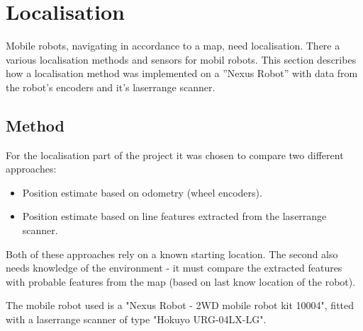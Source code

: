 \section{Localisation}
Mobile robots, navigating in accordance to a map, need localisation.
There a various localisation methods and sensors for mobil robots.
This section describes how a localisation method was implemented on a ''Nexus Robot''
with data from the robot's encoders and it's laserrange scanner.
\subsection{Method}
For the localisation part of the project it was chosen to compare two different approaches:

\begin{itemize}
	\item Position estimate based on odometry (wheel encoders).
	\item Position estimate based on line features extracted from the laserrange scanner. 
\end{itemize}

Both of these approaches rely on a known starting location. The second also needs knowledge of the environment - it must  compare the extracted features with probable features from the map (based on last know location of the robot). 


The mobile robot used is a "Nexus Robot - 2WD mobile robot kit 10004", fitted with a laserrange scanner of type "Hokuyo URG-04LX-LG". 

